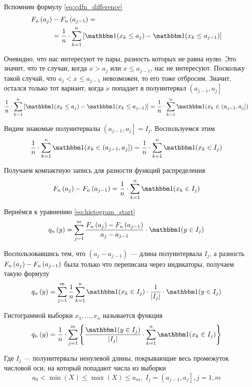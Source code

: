 Вспомним формулу \eqref{eq:cdfn_difference}
\begin{align*}
  \cdfn{a_j}&-\cdfn{a_{j-1}}=\\
  &=\frac{1}{n}\cdot \sum_{k=1}^n
  \left[\indicator{x_k\le a_j}-\indicator{x_k\le a_{j-1}}\right]
\end{align*}

Очевидно, что нас интересуют те пары, разность которых не равна нулю.
Это значит, что те случаи, когда $x>a_j$ или $x\le a_{j-1}$, нас не интересуют.
Поскольку такой случай, что $a_j<x\le a_{j-1}$ невозможен, то его тоже отбросим.
Значит, остался только тот вариант,
когда $x$ попадает в полуинтервал $\left(a_{j-1},a_j\right]$
$$\frac{1}{n}\cdot \sum_{k=1}^n
    \left[\indicator{x_k\le a_j}-\indicator{x_k\le a_{j-1}}\right]
  =\frac{1}{n}\cdot \sum_{k=1}^n \indicator{x_k\in \left(a_{j-1},a_j\right]}
$$

Видим знакомые полуинтервалы $\left(a_{j-1},a_j\right]=I_j$. Воспользуемся этим
$$\frac{1}{n}\cdot \sum_{k=1}^n \indicator{x_k\in \left(a_{j-1},a_j\right]}
=\frac{1}{n}\cdot \sum_{k=1}^n \indicator{x_k\in I_j}$$

Получаем компактную запись для разности функций распределения
\begin{equation}\label{eq:cdfn_difference_final}
\cdfn{a_j}-\cdfn{a_{j-1}}
=\frac{1}{n}\cdot \sum_{k=1}^n \indicator{x_k\in I_j}
\end{equation}


Вернёмся к уравнению \eqref{eq:histogram_start}
$$
q_n\left(y\right)
=\sum_{j=1}^m \frac{\cdfn{a_j}-\cdfn{a_{j-1}}}{a_j-a_{j-1}}
  \cdot\indicator{y\in I_j}
  $$

Воспользовавшись тем,
что $\left(a_j-a_{j-1}\right)$ --- длина полуинтервала $I_j$,
а разность $F_n\left(a_j\right)-F_n\left(a_{j-1}\right)$ была только что переписана
через индикаторы, получаем такую формулу
\begin{equation}\label{eq:histogramPreFinal}
  q_n\left(y\right)
    =\sum_{j=1}^m\frac{1}{n}\sum_{k=1}^n
      \indicator{x_k\in I_j}\cdot\frac{1}{\left|I_j\right|}
      \cdot \indicator{y \in I_j}
\end{equation}

\begin{definition}[Гистограмма]
  Гистограммой выборки $x_1, \dots, x_n$ называется функция
  $$q_n\left( y \right)
  = \frac{1}{n} \cdot \sum_{j=1}^{m} \left\{
    \frac{\indicator{y \in I_j}}{\left| I_j \right|}
    \cdot \sum_{k=1}^{n} \indicator{x_k\in I_j} \right\}$$

  Где $I_j$ --- полуинтервалы ненулевой длины, покрывающие весь промежуток
  числовой оси, на который попадают числа из выборки
  $$a_0 < \min\left( X \right) \le \max\left( X \right) \le a_m,\;
    I_j = \left( a_{j-1}, a_j \right], j = \overline{1, m}$$
\end{definition}

